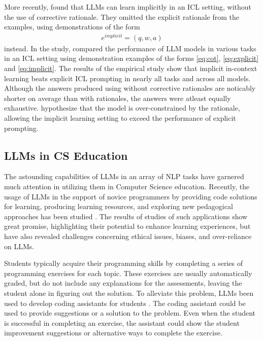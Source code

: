 \documentclass[english, 12pt, a4paper, sci, utf8, a-2b, online]{../definitions/aaltothesis}
\begin{document}
More recently, \textcite{alazraki-etal-2025-need} found that LLMs can learn implicitly in an ICL setting, without the use of corrective rationale. They omitted the explicit rationale from the examples, using demonstrations of the form
\begin{align} \label{eq:implicit}
    e^{implicit} = (q, w, a)
\end{align}
instead. In the study, \textcite{alazraki-etal-2025-need} compared the performance of LLM models in various  tasks in an ICL setting using demonstration examples of the forms \ref{eq:cot}, \ref{eq:explicit} and \ref{eq:implicit}. The results of the empirical study show that implicit in-context learning beats explicit ICL prompting in nearly all tasks and across all models. Although the answers produced using without corrective rationales are noticably shorter on average than with rationales, the answers were atleast equally exhaustive. \textcite{alazraki-etal-2025-need} hypothesize that the model is over-constrained by the rationale, allowing the implicit learning setting to exceed the performance of explicit prompting.

\subsection{LLMs in CS Education} \label{sec:cs_edu}

The astounding capabilities of LLMs in an array of NLP tasks have garnered much attention in utilizing them in Computer Science education. Recently, the usage of LLMs in the support of novice programmers by providing code solutions for learning, producing learning resources, and exploring new pedagogical approaches has been studied \cite{10.1145/3545945.3569759}. The results of studies of such applications show great promise, highlighting their potential to enhance learning experiences, but have also revealed challenges concerning ethical issues, biases, and over-reliance on LLMs.

Students typically acquire their programming skills by completing a series of programming exercises for each topic. These exercises are usually automatically graded, but do not include any explanations for the assessments, leaving the student alone in figuring out the solution. To alleviate this problem, LLMs been used to develop coding assistants for students \cite{10.1145/3631802.3631830}. The coding assistant could be used to provide suggestions or a solution to the problem. Even when the student is successful in completing an exercise, the assistant could show the student improvement suggestions or alternative ways to complete the exercise. 
\end{document}
